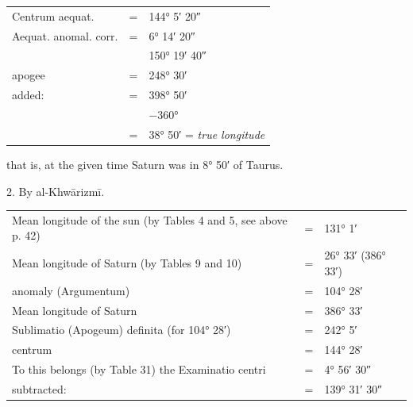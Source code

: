 \documentclass[11pt]{article}
\newcommand{\Pg}[1]{\marginpar{\footnotesize\color{gray}#1}}
\begin{document}
\Pg{53}\begin{center}\small\begin{tabular}{lcl}
Centrum aequat. & = & 144° 5′ 20″ \\
Aequat. anomal. corr. & = & 6° 14′ 20″ \\
 &  & 150° 19′ 40″ \\
apogee & = & 248° 30′ \\
added: & = & 398° 50′ \\
 &  & −360° \\
 & = & 38° 50′ = \emph{true longitude} \\
\end{tabular}\end{center}
\par that is, at the given time Saturn was in 8° 50′ of Taurus.\par
\par\begin{center}2. By al-Khwārizmī.\end{center}
\begin{center}\small\begin{tabular}{lcl}
Mean longitude of the sun (by Tables 4 and 5, see above p. 42) & = & 131° 1′\footnotemark{} \\
Mean longitude of Saturn (by Tables 9 and 10) & = & 26° 33′ (386° 33′) \\
anomaly (Argumentum) & = & 104° 28′ \\
Mean longitude of Saturn & = & 386° 33′ \\
Sublimatio (Apogeum) definita (for 104° 28′) & = & 242° 5′\footnotemark{} \\
centrum & = & 144° 28′ \\
To this belongs (by Table 31) the Examinatio centri & = & 4° 56′ 30″\footnotemark{} \\
subtracted: & = & 139° 31′ 30″ \\
\end{tabular}\end{center}
\addtocounter{footnote}{-3}
\end{document}
